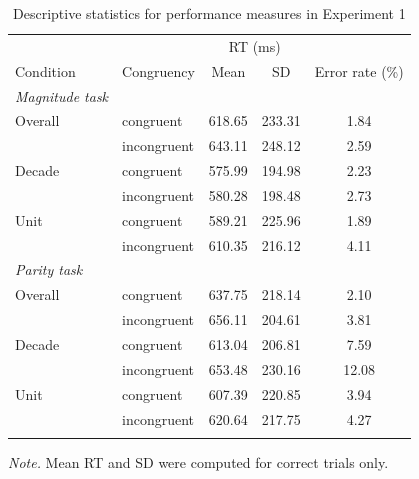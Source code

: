 \documentclass[english,man]{apa6}
\theoremstyle{definition}
\theoremstyle{definition}
\theoremstyle{definition}
\theoremstyle{remark}
\begin{document}
\begin{table}[tbp]
\begin{center}
\begin{threeparttable}
\caption{\label{tab:exp1table}Descriptive statistics for performance measures in Experiment 1}
\begin{tabular}{llccc}
\toprule
 &  & \multicolumn{2}{c}{RT (ms)}  &\\
\cmidrule(r){3-4}
Condition & \multicolumn{1}{c}{Congruency} & \multicolumn{1}{c}{Mean} & \multicolumn{1}{c}{SD} & \multicolumn{1}{c}{Error rate (\%)}\\
\midrule
{\it Magnitude task} &  &  &  & \\
Overall & congruent & 618.65 & 233.31 & 1.84\\
 & incongruent & 643.11 & 248.12 & 2.59\\
Decade & congruent & 575.99 & 194.98 & 2.23\\
 & incongruent & 580.28 & 198.48 & 2.73\\
Unit & congruent & 589.21 & 225.96 & 1.89\\
 & incongruent & 610.35 & 216.12 & 4.11\\
{\it Parity task} &  &  &  & \\
Overall & congruent & 637.75 & 218.14 & 2.10\\
 & incongruent & 656.11 & 204.61 & 3.81\\
Decade & congruent & 613.04 & 206.81 & 7.59\\
 & incongruent & 653.48 & 230.16 & 12.08\\
Unit & congruent & 607.39 & 220.85 & 3.94\\
 & incongruent & 620.64 & 217.75 & 4.27\\
\bottomrule
\addlinespace
\end{tabular}
\begin{tablenotes}[para]
\textit{Note.} Mean RT and SD were computed for correct trials only.
\end{tablenotes}
\end{threeparttable}
\end{center}
\end{table}
\end{document}

